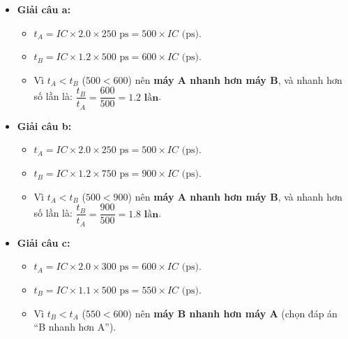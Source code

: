 \begin{itemize}
    \item \textbf{Giải câu a:}
    \begin{itemize}
        \item $t_A = IC \times 2.0 \times 250\text{ ps} = 500 \times IC\text{ (ps)}$.
        \item $t_B = IC \times 1.2 \times 500\text{ ps} = 600 \times IC\text{ (ps)}$.
        \item Vì $t_A < t_B$ ($500 < 600$) nên \textbf{máy A nhanh hơn máy B}, và nhanh hơn số lần là: $\dfrac{t_B}{t_A} = \dfrac{600}{500} = \mathbf{1.2\text{ lần}}$.
    \end{itemize}
    \item \textbf{Giải câu b:}
    \begin{itemize}
        \item $t_A = IC \times 2.0 \times 250\text{ ps} = 500 \times IC\text{ (ps)}$.
        \item $t_B = IC \times 1.2 \times 750\text{ ps} = 900 \times IC\text{ (ps)}$.
        \item Vì $t_A < t_B$ ($500 < 900$) nên \textbf{máy A nhanh hơn máy B}, và nhanh hơn số lần là: $\dfrac{t_B}{t_A} = \dfrac{900}{500} = \mathbf{1.8\text{ lần}}$.
    \end{itemize}
    \item \textbf{Giải câu c:}
    \begin{itemize}
        \item $t_A = IC \times 2.0 \times 300\text{ ps} = 600 \times IC\text{ (ps)}$.
        \item $t_B = IC \times 1.1 \times 500\text{ ps} = 550 \times IC\text{ (ps)}$.
        \item Vì $t_B < t_A$ ($550 < 600$) nên \textbf{máy B nhanh hơn máy A} (chọn đáp án ``B nhanh hơn A'').
    \end{itemize}
\end{itemize}

